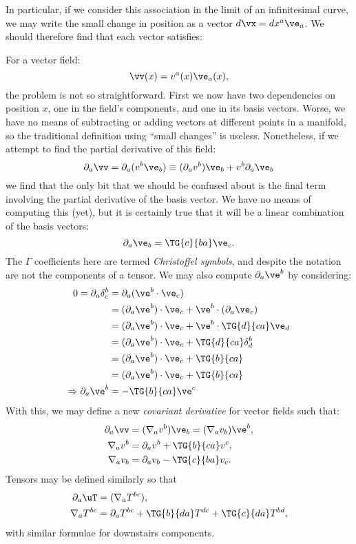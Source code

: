 In particular, if we consider this association in the limit of an infinitesimal curve, we may write the small change in position as a vector $d\vx = dx^a \ve_a$. We should therefore find that each vector satisfies:

For a vector field:
\begin{equation}
 \vv(x) = v^a(x)\ve_a(x),
  \label{eqn:dg:vector_field}
\end{equation}
the problem is not so straightforward. First we now have two dependencies on position $x$, one in the field's components, and one in its basis vectors. Worse, we have no means of subtracting or adding vectors at different points in a manifold, so the traditional definition using ``small changes'' is useless. Nonetheless, if we attempt to find the partial derivative of this field:
\begin{equation}
  \partial_a\vv = \partial_a(v^b\ve_b) \equiv (\partial_a v^b) \ve_b + v^b \partial_a\ve_b
  \label{eqn:dg:partial_expand}
\end{equation}
we find that the only bit that we should be confused about is the final term involving the partial derivative of the basis vector. We have no means of computing this (yet), but it is certainly true that it will be a linear combination of the basis vectors:
\begin{equation}
  \partial_a\ve_b = \TG{c}{ba} \ve_c.
  \label{eqn:dg:gamma_def}
\end{equation}
The $\Gamma$ coefficients here are termed {\em Christoffel symbols}, and despite the notation are not the components of a tensor. We may also compute $\partial_a \ve^b$ by considering:
\begin{align}
  0 = \partial_a \delta^b_c &= \partial_a (\ve^b\cdot\ve_c)  
  \nonumber\\
  &= (\partial_a\ve^b)\cdot\ve_c + \ve^b\cdot(\partial_a\ve_c)
  \nonumber \\
  &= (\partial_a\ve^b)\cdot\ve_c + \ve^b\cdot\TG{d}{ca} \ve_d 
  \nonumber \\
  &= (\partial_a\ve^b)\cdot\ve_c + \TG{d}{ca} \delta^b_d
  \nonumber \\
  &= (\partial_a\ve^b)\cdot\ve_c + \TG{b}{ca} 
  \nonumber \\
  &= (\partial_a\ve^b)\cdot\ve_c + \TG{b}{ca} 
  \nonumber \\
  \Rightarrow \partial_a\ve^b
  &=  - \TG{b}{ca} \ve^c
  \label{eqn:dg:chris_deriv}
\end{align}
With this, we may define a new {\em covariant derivative\/} for vector fields such that:
\begin{align}
  \partial_a\vv &= (\nabla_a v^b) \ve_b = (\nabla_a v_b) \ve^b,
  \\
  \nabla_a v^b &= \partial_a v^b + \TG{b}{ca} v^c,
   \\
   \nabla_a v_b &= \partial_a v_b - \TG{c}{ba} v_c.
\end{align}
Tensors may be defined similarly so that
\begin{align}
  \partial_a \uT &= (\nabla_a T^{bc}),
  \\
  \nabla_a T^{bc} &= \partial_a T^{bc} + \TG{b}{da}T^{dc} + \TG{c}{da}T^{bd},
\end{align}
with similar formulae for downstairs components.

